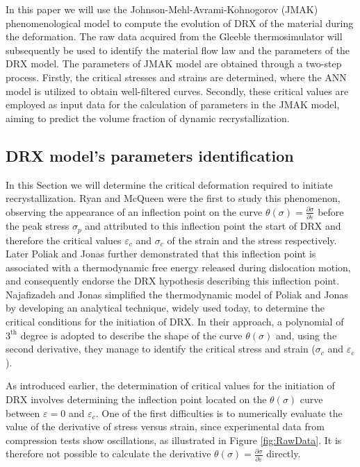 \documentclass[metals,article,submit,pdftex,moreauthors]{Definitions/mdpi}
\begin{document}
In this paper we will use the Johnson-Mehl-Avrami-Kohnogorov (JMAK) phenomenological model \cite{Avrami-1939} to compute the evolution of DRX of the material during the deformation.
The raw data acquired from the Gleeble thermosimulator will subsequently be used to identify the material flow law and the parameters of the DRX model.
The parameters of JMAK model are obtained through a two-step process.
Firstly, the critical stresses and strains are determined, where the ANN model is utilized to obtain well-filtered curves.
Secondly, these critical values are employed as input data for the calculation of parameters in the JMAK model, aiming to predict the volume fraction of dynamic recrystallization.

\subsection{DRX model's parameters identification\label{subsec:DRXParameters}}

In this Section we will determine the critical deformation required to initiate recrystallization.
Ryan and McQueen \cite{Ryan-1989, Ryan-1990, Ryan-1990-2} were the first to study this phenomenon, observing the appearance of an inflection point on the curve $\theta(\sigma)=\frac{\partial \sigma}{\partial \varepsilon}$ before the peak stress $\sigma_p$ and attributed to this inflection point the start of DRX and therefore the critical values $\varepsilon_c$ and $\sigma_c$ of the strain and the stress respectively.
Later Poliak and Jonas \cite{Poliak-1996, Poliak-2003, Poliak-2003-2, Jonas-2003} further demonstrated that this inflection point is associated with a thermodynamic free energy released during dislocation motion, and consequently endorse the DRX hypothesis describing this inflection point.
Najafizadeh and Jonas \cite{Najafizadeh-2006} simplified the thermodynamic model of Poliak and Jonas by developing an analytical technique, widely used today, to determine the critical conditions for the initiation of DRX.
In their approach, a polynomial of $3^\text{th}$ degree is adopted to describe the shape of the curve $\theta(\sigma)$ and, using the second derivative, they manage to identify the critical stress and strain ($\sigma_c$ and $\varepsilon_c$).

As introduced earlier, the determination of critical values for the initiation of DRX involves determining the inflection point located on the $\theta(\sigma)$ curve between $\varepsilon=0$ and $\varepsilon_c$.
One of the first difficulties is to numerically evaluate the value of the derivative of stress versus strain, since experimental data from compression tests show oscillations, as illustrated in Figure \ref{fig:RawData}.
It is therefore not possible to calculate the derivative $\theta(\sigma)=\frac{\partial \sigma}{\partial \varepsilon}$ directly.
\end{document}
